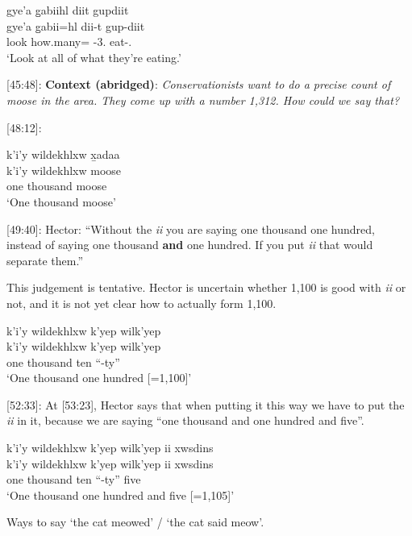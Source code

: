 \begin{exe}
    \ex \glll gye'a g̱abiihl diit gupdiit \\
    gye'a g̱abii=hl dii-t gup-diit \\
    look how.many=\Cn{} \Foc{}-\textsc{3}.\I{} eat-\Tpl{}.\Ii{}\\
    `Look at all of what they're eating.'
\end{exe}


[45:48]: \textbf{Context (abridged)}: \textit{Conservationists want to do a precise count of moose in the area. They come up with a number 1,312. How could we say that?}

[48:12]:

\begin{exe}
    \ex \glll k'i'y wildekhlxw x̱adaa \\
    k'i'y wildekhlxw moose \\
    one thousand moose\\
    `One thousand moose'
\end{exe}

[49:40]: Hector: ``Without the \textit{ii} you are saying one thousand one hundred, instead of saying one thousand \textbf{and} one hundred. If you put \textit{ii} that would separate them.''

This judgement is tentative. Hector is uncertain whether 1,100 is good with \textit{ii} or not, and it is not yet clear how to actually form 1,100.


\begin{exe}
    \ex \glll k'i'y wildekhlxw k'yep wilk'yep \\
    k'i'y wildekhlxw k'yep wilk'yep \\
    one thousand ten ``-ty''\\
    `One thousand one hundred [=1,100]'
\end{exe}

[52:33]: At [53:23], Hector says that when putting it this way we have to put the \textit{ii} in it, because we are saying ``one thousand and one hundred and five''.
\begin{exe}
    \ex \glll k'i'y wildekhlxw k'yep wilk'yep ii xwsdins \\
    k'i'y wildekhlxw k'yep wilk'yep ii xwsdins \\
    one thousand ten ``-ty'' \Ccnj{} five\\
    `One thousand one hundred and five [=1,105]'
\end{exe}

Ways to say `the cat meowed' / `the cat said meow'.

